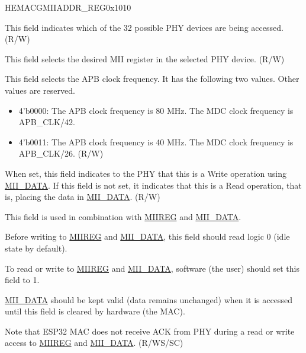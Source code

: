 \begin{register}{H}{EMACGMIIADDR\_REG}{0x1010}\label{regdesc:EMACMIIADDRREG}
%
%
%
%
%
%
\regnewline%
\begin{regdesc}\begin{reglist}
\item [MIIDEV]This field indicates which of the 32 possible PHY devices are being accessed. (R/W)
\item [MIIREG]\label{fielddesc:MIIREG}This field selects the desired MII register in the selected PHY device. (R/W)
\item  [MIICSRCLK]\label{fielddesc:MIICSRCLK} This field selects the APB clock frequency. It has the following two values. Other values are reserved.
\begin{itemize}
\item 4'b0000: The APB clock frequency is 80 MHz. The MDC clock frequency is APB\_CLK/42.
\item 4'b0011: The APB clock frequency is 40 MHz. The MDC clock frequency is APB\_CLK/26. (R/W)
\end{itemize}


\item [MIIWRITE]When set, this field indicates to the PHY that this is a Write operation using \hyperref[regdesc:EMACMIIDATAREG]{MII\_DATA}. If this field is not set, it indicates that this is a Read operation, that is, placing the data in \hyperref[regdesc:EMACMIIDATAREG]{MII\_DATA}. (R/W)
\item [MIIBUSY]\label{fielddesc:MIIBUSY} This field is used in combination with \hyperref[fielddesc:MIIREG]{MIIREG} and \hyperref[regdesc:EMACMIIDATAREG]{MII\_DATA}.

Before writing to \hyperref[fielddesc:MIIREG]{MIIREG} and \hyperref[regdesc:EMACMIIDATAREG]{MII\_DATA}, this field should read logic 0 (idle state by default).

To read or write to \hyperref[fielddesc:MIIREG]{MIIREG} and \hyperref[regdesc:EMACMIIDATAREG]{MII\_DATA}, software (the user) should set this field to 1.

\hyperref[regdesc:EMACMIIDATAREG]{MII\_DATA} should be kept valid (data remains unchanged) when it is accessed until this field is cleared by hardware (the MAC).

Note that ESP32 MAC does not receive ACK from PHY during a read or write access to \hyperref[fielddesc:MIIREG]{MIIREG} and \hyperref[regdesc:EMACMIIDATAREG]{MII\_DATA}. (R/WS/SC)
\end{reglist}\end{regdesc}
\end{register}


